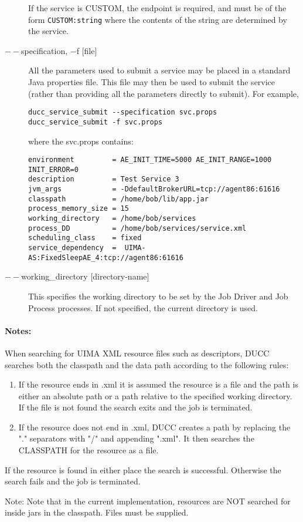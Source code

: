 \begin{description}
        If the service is CUSTOM, the endpoint is required, and must be of the form
        {\tt CUSTOM:string} where the contents of the string are determined by the service.

      \item[$--$specification, $-$f {[file]}] All the parameters used to submit a service may be placed in a
        standard Java properties file.  This file may then be used to submit the service (rather than
        providing all the parameters directly to submit).
        For example, 

\begin{verbatim}
ducc_service_submit --specification svc.props 
ducc_service_submit -f svc.props 
\end{verbatim}
        
        where the svc.props contains: 

\begin{verbatim}
environment         = AE_INIT_TIME=5000 AE_INIT_RANGE=1000 INIT_ERROR=0
description         = Test Service 3
jvm_args            = -DdefaultBrokerURL=tcp://agent86:61616
classpath           = /home/bob/lib/app.jar
process_memory_size = 15
working_directory   = /home/bob/services
process_DD          = /home/bob/services/service.xml
scheduling_class    = fixed
service_dependency  =  UIMA-AS:FixedSleepAE_4:tcp://agent86:61616
\end{verbatim}
        
        \item[$--$working\_directory {[directory-name]}]
          This specifies the working directory to be set by the Job Driver and Job Process processes. 
          If not specified, the current directory is used.
    \end{description}
        
    \paragraph{Notes:}
    When searching for UIMA XML resource files such as descriptors, DUCC searches both the 
    classpath and the data path according to the following rules: 

    \begin{enumerate}
        \item If the resource ends in .xml it is assumed the resource is a file and the path is either
          an absolute path or a path relative to the specified working directory. If the file is not
          found the search exits and the job is terminated.

        \item If the resource does not end in .xml, DUCC creates a path by replacing the "." 
          separators with "/" and appending ".xml". It then searches the CLASSPATH for the 
          resource as a file. 
    \end{enumerate}

    If the resource is found in either place the search is successful. Otherwise the search 
    fails and the job is terminated. 

    Note: Note that in the current implementation, resources are NOT searched    
    for inside jars in the classpath. Files must be supplied. 


